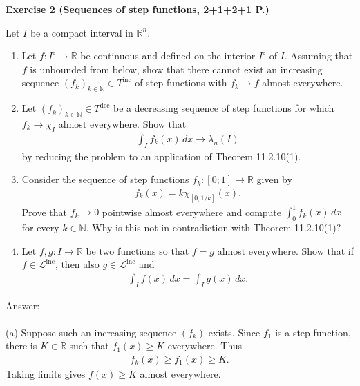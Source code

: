\documentclass[12pt,a4paper]{article}
\begin{document}
\newpage
\noindent\textbf{Exercise 2 (Sequences of step functions, 2+1+2+1 P.)}

\noindent Let $I$ be a compact interval in $\mathbb{R}^n$.
\begin{enumerate}
\item[(a)] Let $f:I^\circ\to\mathbb{R}$ be continuous and defined on the interior $I^\circ$ of $I$. Assuming that $f$ is unbounded from below, show that there cannot exist an increasing sequence $(f_k)_{k\in\mathbb{N}}\in T^{\mathrm{inc}}$ of step functions with $f_k\to f$ almost everywhere.
\item[(b)] Let $(f_k)_{k\in\mathbb{N}}\in T^{\mathrm{dec}}$ be a decreasing sequence of step functions for which $f_k\to\chi_I$ almost everywhere. Show that
\begin{align*}
\int_I f_k(x)\,dx\to\lambda_n(I)
\end{align*}
by reducing the problem to an application of Theorem 11.2.10(1).
\item[(c)] Consider the sequence of step functions $f_k:[0;1]\to\mathbb{R}$ given by
\begin{align*}
f_k(x)=k\chi_{[0;1/k]}(x).
\end{align*}
Prove that $f_k\to 0$ pointwise almost everywhere and compute $\int_0^1 f_k(x)\,dx$ for every $k\in\mathbb{N}$. Why is this not in contradiction with Theorem 11.2.10(1)?
\item[(d)] Let $f,g:I\to\mathbb{R}$ be two functions so that $f=g$ almost everywhere. Show that if $f\in\mathcal{L}^{\mathrm{inc}}$, then also $g\in\mathcal{L}^{\mathrm{inc}}$ and
\begin{align*}
\int_I f(x)\,dx=\int_I g(x)\,dx.
\end{align*}
\end{enumerate}

\vspace{1cm}
\noindent
Answer:\\
\\
(a) Suppose such an increasing sequence $(f_k)$ exists.
Since $f_1$ is a step function, there is $K\in\mathbb{R}$
such that $f_1(x)\geq K$ everywhere. Thus
\begin{align*}
f_k(x)\geq f_1(x)\geq K.
\end{align*}
Taking limits gives $f(x)\geq K$ almost everywhere.
\end{document}
